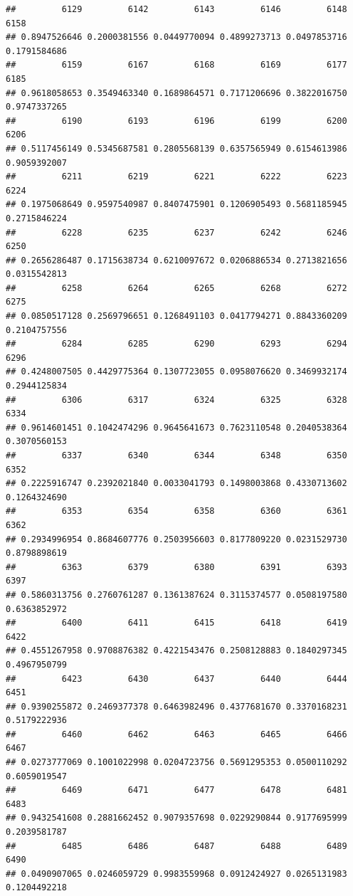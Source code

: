 \documentclass[
]{article}
\begin{document}
\begin{verbatim}
##         6129         6142         6143         6146         6148         6158 
## 0.8947526646 0.2000381556 0.0449770094 0.4899273713 0.0497853716 0.1791584686 
##         6159         6167         6168         6169         6177         6185 
## 0.9618058653 0.3549463340 0.1689864571 0.7171206696 0.3822016750 0.9747337265 
##         6190         6193         6196         6199         6200         6206 
## 0.5117456149 0.5345687581 0.2805568139 0.6357565949 0.6154613986 0.9059392007 
##         6211         6219         6221         6222         6223         6224 
## 0.1975068649 0.9597540987 0.8407475901 0.1206905493 0.5681185945 0.2715846224 
##         6228         6235         6237         6242         6246         6250 
## 0.2656286487 0.1715638734 0.6210097672 0.0206886534 0.2713821656 0.0315542813 
##         6258         6264         6265         6268         6272         6275 
## 0.0850517128 0.2569796651 0.1268491103 0.0417794271 0.8843360209 0.2104757556 
##         6284         6285         6290         6293         6294         6296 
## 0.4248007505 0.4429775364 0.1307723055 0.0958076620 0.3469932174 0.2944125834 
##         6306         6317         6324         6325         6328         6334 
## 0.9614601451 0.1042474296 0.9645641673 0.7623110548 0.2040538364 0.3070560153 
##         6337         6340         6344         6348         6350         6352 
## 0.2225916747 0.2392021840 0.0033041793 0.1498003868 0.4330713602 0.1264324690 
##         6353         6354         6358         6360         6361         6362 
## 0.2934996954 0.8684607776 0.2503956603 0.8177809220 0.0231529730 0.8798898619 
##         6363         6379         6380         6391         6393         6397 
## 0.5860313756 0.2760761287 0.1361387624 0.3115374577 0.0508197580 0.6363852972 
##         6400         6411         6415         6418         6419         6422 
## 0.4551267958 0.9708876382 0.4221543476 0.2508128883 0.1840297345 0.4967950799 
##         6423         6430         6437         6440         6444         6451 
## 0.9390255872 0.2469377378 0.6463982496 0.4377681670 0.3370168231 0.5179222936 
##         6460         6462         6463         6465         6466         6467 
## 0.0273777069 0.1001022998 0.0204723756 0.5691295353 0.0500110292 0.6059019547 
##         6469         6471         6477         6478         6481         6483 
## 0.9432541608 0.2881662452 0.9079357698 0.0229290844 0.9177695999 0.2039581787 
##         6485         6486         6487         6488         6489         6490 
## 0.0490907065 0.0246059729 0.9983559968 0.0912424927 0.0265131983 0.1204492218 

\end{verbatim}
\end{document}
